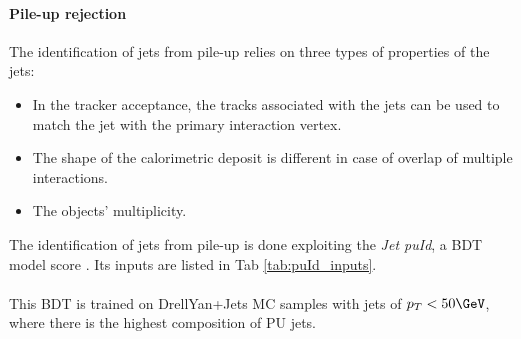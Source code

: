 \paragraph*{Pile-up rejection}
The identification of jets from pile-up relies on three types of properties of the jets:
\begin{itemize}
    \item  In the tracker acceptance, the tracks associated with the jets can be used to match the jet with the primary interaction vertex.
    \item The shape of the calorimetric deposit is different in case of overlap of multiple interactions.
    \item The objects' multiplicity.
\end{itemize}


\begin{minipage}{\linewidth}
    \begin{minipage}{0.35\linewidth}
    
        The identification of jets from pile-up is done exploiting the \emph{Jet puId},
        a BDT model score \cite{CMSCollaboration2020PileupData}. Its inputs are listed in Tab \ref{tab:puId_inputs}.\\
        \\
        This BDT is trained on DrellYan+Jets MC samples with jets of $p_T<50\GeV$, where there is the highest composition of PU jets.\\
        

\end{minipage}
\end{minipage}
